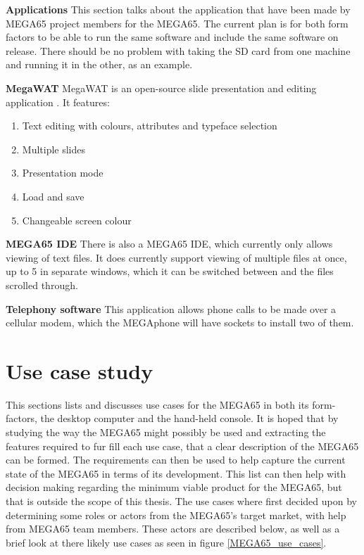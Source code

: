 \textbf{Applications}
This section talks about the application that have been made by MEGA65 project members for the MEGA65. The current plan is for both form factors to be able to run the same software and include the same software on release. There should be no problem with taking the SD card from one machine and running it in the other, as an example.

\textbf{MegaWAT} 
MegaWAT is an open-source slide presentation and editing application \cite{RN163}. It features:
\begin{enumerate}
\item Text editing with colours, attributes and typeface selection
\item Multiple slides
\item Presentation mode
\item Load and save
\item Changeable screen colour
\end{enumerate}

\textbf{MEGA65 IDE}
There is also a MEGA65 IDE, which currently only allows viewing of text files. It does currently support viewing of multiple files at once, up to 5 in separate windows, which it can be switched between and the files scrolled through.

\textbf{Telephony software}
This application allows phone calls to be made over a cellular modem, which the MEGAphone will have sockets to install two of them. 


\section{Use case study}
This sections lists and discusses use cases for the MEGA65 in both its form-factors, the desktop computer and the hand-held console. It is hoped that by studying the way the MEGA65 might possibly be used and extracting the features required to fur fill each use case, that a clear description of the MEGA65 can be formed. The requirements can then be used to help capture the current state of the MEGA65 in terms of its development. This list can then help with decision making regarding the minimum viable product for the MEGA65, but that is outside the scope of this thesis. The use cases where first decided upon by determining some roles or actors from the MEGA65's target market, with help from MEGA65 team members. These actors are described below, as well as a brief look at there likely use cases as seen in figure \ref{MEGA65_use_cases}.

